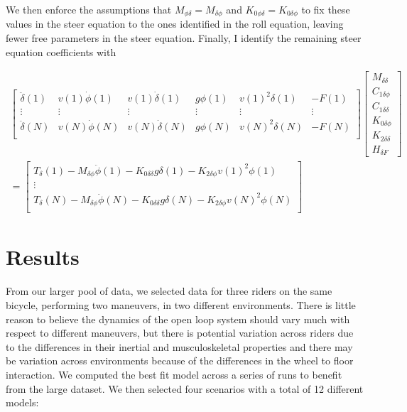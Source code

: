 \documentclass[a4paper]{article}
\begin{document}
We then enforce the assumptions that $M_{\phi\delta} = M_{\delta\phi}$ and
$K_{0\phi\delta} = K_{0\delta\phi}$ to fix these values in the steer equation
to the ones identified in the roll equation, leaving fewer free parameters in
the steer equation. Finally, I identify the remaining steer equation
coefficients with

\begin{align}
  \begin{bmatrix}
    \ddot{\delta}(1) &
    v(1) \dot{\phi}(1) &
    v(1) \dot{\delta}(1) &
    g \phi(1) &
    v(1)^2 \delta(1) &
    - F(1)\\
    \vdots & \vdots & \vdots & \vdots & \vdots & \vdots \\
    \ddot{\delta}(N) &
    v(N) \dot{\phi}(N) &
    v(N) \dot{\delta}(N) &
    g \phi(N) &
    v(N)^2 \delta(N) &
    - F(N)\\
  \end{bmatrix}
  \begin{bmatrix}
    M_{\delta\delta} \\
    C_{1\delta\phi} \\
    C_{1\delta\delta} \\
    K_{0\delta\phi} \\
    K_{2\delta\delta} \\
    H_{\delta F}
  \end{bmatrix} \nonumber \\
  =
  \begin{bmatrix}
    T_\delta(1)
    - M_{\delta\phi} \ddot{\phi}(1)
    - K_{0\delta\delta} g \delta(1)
    - K_{2\delta\phi} v(1)^2 \phi(1) \\
    \vdots\\
    T_\delta(N)
    - M_{\delta\phi} \ddot{\phi}(N)
    - K_{0\delta\delta} g \delta(N)
    - K_{2\delta\phi} v(N)^2 \phi(N) \\
  \end{bmatrix}
\end{align}

\section{Results}

From our larger pool of data, we selected data for three riders on the same
bicycle, performing two maneuvers, in two different environments. There is
little reason to believe the dynamics of the open loop system should vary much
with respect to different maneuvers, but there is potential variation across
riders due to the differences in their inertial and musculoskeletal properties
and there may be variation across environments because of the differences in
the wheel to floor interaction. We computed the best fit model across a series
of runs to benefit from the large dataset. We then selected four scenarios with
a total of 12 different models:
\end{document}
